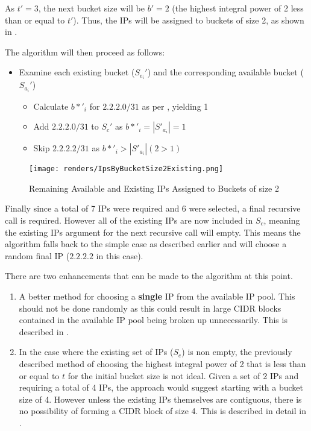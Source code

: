 As $t'=3$, the next bucket size will be $b' = 2$ (the highest integral power of 2 less than or equal to $t'$). Thus, the IPs will be assigned to buckets of size 2, as shown in .

The algorithm will then proceed as follows:
\begin{itemize}
\item{Examine each existing bucket ($S_{e_i}'$) and the corresponding available bucket ($S_{a_i}'$)}
\begin{itemize}
\item{Calculate $b*'_i$ for $2.2.2.0/31$ as per , yielding 1}
\item{Add $2.2.2.0/31$ to $S_c'$ as $b*'_i = |S'_{a_i}| = 1$} 
\item{Skip $2.2.2.2/31$ as $b*'_i > |S'_{a_i}| (2 > 1)$}
\end{itemize}
\end{itemize}

\begin{figure}[H]
      \centering
      \texttt{[image: renders/IpsByBucketSize2Existing.png]}
      \caption{Remaining Available and Existing IPs Assigned to Buckets of size 2}
      \label{fig:ipsByBucketExisting2}
\end{figure}

Finally since a total of 7 IPs were required and 6 were selected, a final recursive call is required. However all of the existing IPs are now included in $S_c$, meaning the existing IPs argument for the next recursive call will empty. This means the algorithm falls back to the simple case as described earlier and will choose a random final IP ($2.2.2.2$ in this case). 

There are two enhancements that can be made to the algorithm at this point.

\begin{enumerate}
\item{A better method for choosing a \textbf{single} IP from the available IP pool. This should not be done randomly as this could result in large CIDR blocks contained in the available IP pool being broken up unnecessarily. This is described in .}
\item{In the case where the existing set of IPs ($S_e$) is non empty, the previously described method of choosing the highest integral power of 2 that is less than or equal to $t$ for the initial bucket size is not ideal. Given a set of 2 IPs and requiring a total of 4 IPs, the approach would suggest starting with a bucket size of 4. However unless the existing IPs themselves are contiguous, there is no possibility of forming a CIDR block of size 4. This is described in detail in .}
\end{enumerate}

